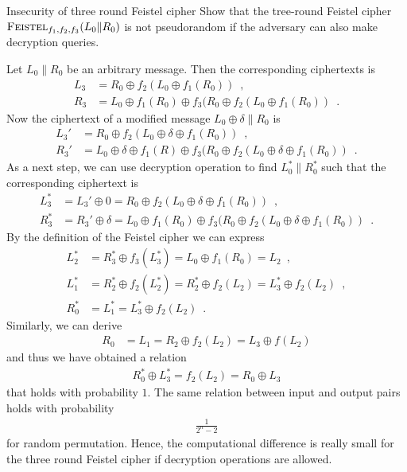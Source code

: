 \documentclass{crypto-exercise}
\author{Sven Laur}
\begin{document}
\begin{exercise}{Insecurity of three round Feistel cipher}
Show that the tree-round Feistel cipher
$\textsc{Feistel}_{f_1,f_2,f_3}(L_0\|R_0)$ is not pseudorandom if the
adversary can also make decryption queries.
\end{exercise}

\begin{solution}
Let $L_0\|R_0$ be an arbitrary message. Then the corresponding
ciphertexts is 
\begin{align*}
  L_3&=R_0\oplus f_2(L_0\oplus f_1(R_0))\enspace,\\
  R_3&=L_0\oplus f_1(R_0)\oplus f_3(R_0\oplus f_2(L_0\oplus f_1(R_0))\enspace.
\end{align*}
Now the ciphertext of a modified message $L_0\oplus\delta\|R_0$ is
\begin{align*}
  L_3'&=R_0\oplus f_2(L_0\oplus\delta\oplus f_1(R_0))\enspace,\\
  R_3'&=L_0\oplus \delta\oplus f_1(R)\oplus f_3(R_0\oplus f_2(L_0\oplus \delta\oplus f_1(R_0))\enspace.
\end{align*}
As a next step, we can use decryption operation to find $L_0^*\|R_0^*$
such that the corresponding ciphertext is
\begin{align*}
  L_3^*&=L_3'\oplus 0=R_0\oplus f_2(L_0\oplus\delta\oplus f_1(R_0))\enspace,\\
  R_3^*&=R_3'\oplus\delta=L_0\oplus f_1(R_0)\oplus f_3(R_0\oplus f_2(L_0\oplus \delta\oplus f_1(R_0))\enspace.
\end{align*}
By the definition of the Feistel cipher we can express
\begin{align*}
  L_2^*&=R_3^*\oplus f_3(L_3^*)=L_0\oplus f_1(R_0)=L_2\enspace,\\
  L_1^*&=R_2^*\oplus f_2(L_2^*)= R_2^*\oplus f_2(L_2)=L_3^*\oplus f_2(L_2) \enspace,\\
  R_0^*&=L_1^*=L_3^*\oplus f_2(L_2)\enspace.
\end{align*}
Similarly, we can derive
\begin{align*}
    R_0&=L_1=R_2\oplus f_2(L_2)=L_3\oplus f(L_2)
\end{align*}
and thus we have obtained a relation
\begin{align*}
  R_0^*\oplus L_3^*= f_2(L_2)=R_0\oplus L_3
\end{align*}
that holds with probability $1$. The same relation between input and
output pairs holds with probability 
\begin{align*}
  \frac{1}{2^n-2}
\end{align*}
for random permutation. Hence, the computational difference is really
small for the three round Feistel cipher if decryption operations are
allowed.
\end{solution}
\end{document}
